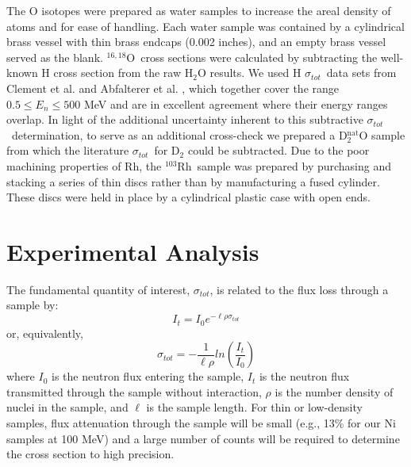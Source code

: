 \documentclass[twocolumn,secnumarabic,amssymb, nobibnotes, aps, prl,
superscriptaddress, nobalancelastpage, draft]{revtex4}
\newcommand{\tot}{\ensuremath{\sigma_{tot}}}
\newcommand{\oSixEight}{\ensuremath{^{16,18}}O}
\newcommand{\rhThree}{\ensuremath{^{103}}R\lowercase{h}}
\begin{document}
The O isotopes were prepared as water samples to increase the areal density
of atoms and for ease of handling. Each water sample was contained by a
cylindrical brass vessel with thin brass endcaps (0.002 inches), and an
empty brass vessel served as the blank. \oSixEight\
cross sections were calculated by
subtracting the well-known H cross section from the raw H$_{2}$O results.
We used H \tot\  data sets from Clement et al. \cite{Clement1972} and Abfalterer
et al. \cite{Abfalterer2001}, which together cover the range $0.5 \leq E_n \leq 500$ MeV
and are in excellent agreement where their energy ranges overlap. In light of
the additional uncertainty inherent to this subtractive \tot\ determination,
to serve as an additional cross-check we prepared a D$_{2}^{\text{nat}}$O sample
from which the literature \tot\ for D$_{2}$ could be subtracted. Due to
the poor machining properties of Rh, the \rhThree\ sample
was prepared by purchasing and stacking a series of thin discs rather than by
manufacturing a fused cylinder. These discs were held in place
by a cylindrical plastic case with open ends.

\section{Experimental Analysis}
The fundamental quantity of interest, \tot, is related to the flux
loss through a sample by:
\begin{equation}
I_{t} = I_{0}e^{-{\ell\rho\sigma_{tot}}}
\end{equation}
or, equivalently,
\begin{equation}
    \tot = -\frac{1}{\ell\rho}ln\left(\frac{I_{t}}{I_{0}}\right)
\end{equation}
where $I_{0}$ is the neutron flux entering the sample, $I_{t}$ is the neutron
flux transmitted through the sample without interaction, $\rho$ is the number
density of nuclei in the sample, and $\ell$ is the sample length. For thin
or low-density samples, flux attenuation through the sample will be small
(e.g., 13\% for our Ni samples at 100 MeV) and a large number
of counts will be required to determine the cross section to high
precision.
\end{document}

